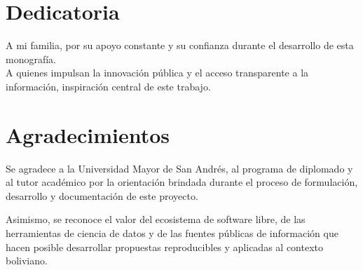\newpage
\section*{Dedicatoria}
\vspace{4cm}

A mi familia, por su apoyo constante y su confianza durante el desarrollo de esta monografía.\\

A quienes impulsan la innovación pública y el acceso transparente a la información, inspiración central de este trabajo.

\newpage
\section*{Agradecimientos}
\vspace{1cm}

Se agradece a la Universidad Mayor de San Andrés, al programa de diplomado y al tutor académico por la orientación brindada durante el proceso de formulación, desarrollo y documentación de este proyecto.

Asimismo, se reconoce el valor del ecosistema de software libre, de las herramientas de ciencia de datos y de las fuentes públicas de información que hacen posible desarrollar propuestas reproducibles y aplicadas al contexto boliviano.
